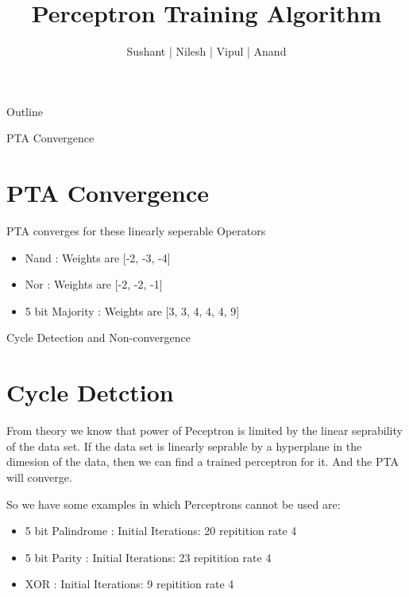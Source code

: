 \documentclass{beamer}
\title[PTA]{Perceptron Training Algorithm}
\author{Sushant | Nilesh | Vipul | Anand}
\institute{Indian Institute of Technology, Bombay}
\begin{document}
\begin{frame}
  \titlepage
\end{frame}


\begin{frame}{Outline}
  \tableofcontents
\end{frame}
\begin{frame}{PTA Convergence}
\section{PTA Convergence}
	PTA converges for these linearly seperable Operators 
    \begin{itemize}
    	\item Nand : Weights are [-2, -3, -4]
        \item Nor : Weights are [-2, -2, -1]
        \item 5 bit Majority : Weights are [3, 3, 4, 4, 4, 9]
     \end{itemize}     

\end{frame}

\begin{frame}{Cycle Detection and Non-convergence}
\section{Cycle Detction}
From theory we know that power of Peceptron is limited by the linear seprability of the data set. If the data set is linearly seprable by a hyperplane in the dimesion of the data, then we can find a trained perceptron for it. And the PTA will converge.

So we have some examples in which Perceptrons cannot be used are:

\begin{itemize}
	\item 5 bit Palindrome : Initial Iterations: 20 repitition rate 4 
    \item 5 bit Parity : Initial Iterations: 23 repitition rate 4 
    \item XOR : Initial Iterations: 9 repitition rate 4 
\end{itemize}
\end{frame}
\end{document}
